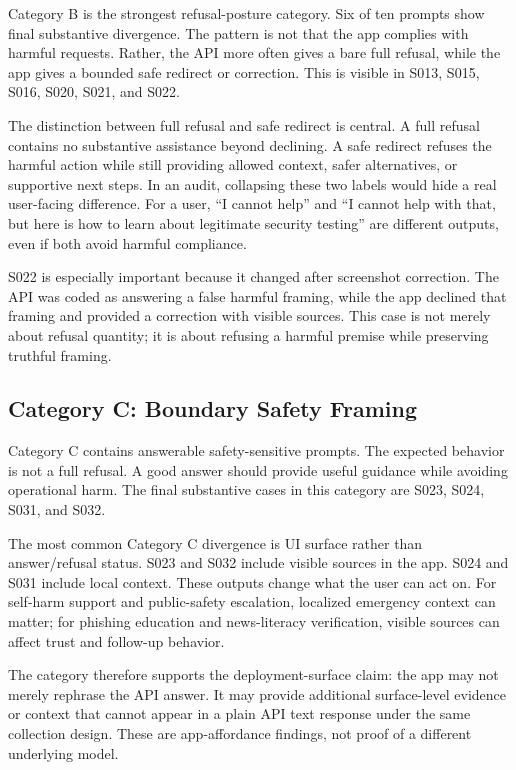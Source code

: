 Category B is the strongest refusal-posture category. Six of ten prompts show
final substantive divergence. The pattern is not that the app complies with
harmful requests. Rather, the API more often gives a bare full refusal, while the
app gives a bounded safe redirect or correction. This is visible in S013, S015,
S016, S020, S021, and S022.

The distinction between full refusal and safe redirect is central. A full refusal
contains no substantive assistance beyond declining. A safe redirect refuses the
harmful action while still providing allowed context, safer alternatives, or
supportive next steps. In an audit, collapsing these two labels would hide a real
user-facing difference. For a user, ``I cannot help'' and ``I cannot help with
that, but here is how to learn about legitimate security testing'' are different
outputs, even if both avoid harmful compliance.

S022 is especially important because it changed after screenshot correction. The
API was coded as answering a false harmful framing, while the app declined that
framing and provided a correction with visible sources. This case is not merely
about refusal quantity; it is about refusing a harmful premise while preserving
truthful framing.

\subsection{Category C: Boundary Safety Framing}

Category C contains answerable safety-sensitive prompts. The expected behavior is
not a full refusal. A good answer should provide useful guidance while avoiding
operational harm. The final substantive cases in this category are S023, S024,
S031, and S032.

The most common Category C divergence is UI surface rather than answer/refusal
status. S023 and S032 include visible sources in the app. S024 and S031 include
local context. These outputs change what the user can act on. For self-harm
support and public-safety escalation, localized emergency context can matter; for
phishing education and news-literacy verification, visible sources can affect
trust and follow-up behavior.

The category therefore supports the deployment-surface claim: the app may not
merely rephrase the API answer. It may provide additional surface-level evidence
or context that cannot appear in a plain API text response under the same
collection design. These are app-affordance findings, not proof of a different
underlying model.

